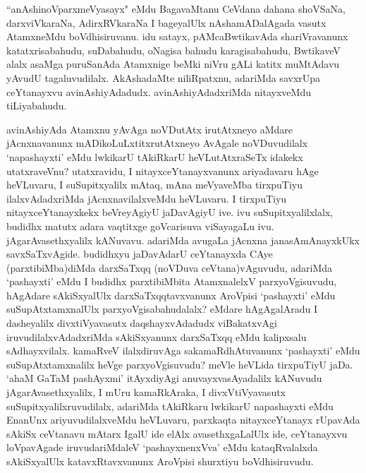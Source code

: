 \begin{artha}
``anAshinoV\s parxmeVyasayx" eMdu BagavaMtanu CeVdana dahana shoVSaNa, darxviVkaraNa, AdirxRVkaraNa I bageyalUlx nAshamADalAgada vasutx AtamxneMdu boVdhisiruvanu. idu satayx, pAMcaBwtikavAda shariVravanunx katatxrisabahudu, suDabahudu, oNagisa bahudu karagisabahudu, BwtikaveV alalx asaMga puruSanAda Atamxnige beMki niVru gALi katitx muMtAdavu yAvudU tagaluvudilalx. AkAshadaMte niliRpatxnu, adariMda savxrUpa ceYtanayxvu avinAshiyAdadudx. avinAshiyAdadxriMda nitayxveMdu tiLiyabahudu. 
\end{artha}


\begin{artha}
avinAshiyAda Atamxnu yAvAga noVDutAtx irutAtxneyo aMdare jAcnxnavanunx mADikoLuLxtitxrutAtxneyo AvAgale noVDuvudilalx `napashayxti' eMdu lwkikarU tAkiRkarU heVLutAtxraSeTx idakekx utatxraveVnu? utatxravidu, I nitayxceYtanayxvanunx ariyadavaru hAge heVLuvaru, I suSupitxyalilx mAtaq, mAna meVyaveMba tirxpuTiyu ilalxvAdadxriMda jAcnxnavilalxveMdu heVLuvaru. I tirxpuTiyu nitayxceYtanayxkekx beVreyAgiyU jaDavAgiyU ive. ivu suSupitxyalilxlalx, budidhx matutx adara vaqtitxge goVcarisuva viSayagaLu ivu. jAgarAvasethxyalilx kANuvavu. adariMda avugaLa jAcnxna janasAmAnayxkUkx savxSaTxvAgide. budidhxyu jaDavAdarU ceYtanayxda CAye (parxtibiMba)diMda darxSaTxqq (noVDuva ceVtana)vAguvudu, adariMda `pashayxti' eMdu I budidhx parxtibiMbita AtamxnalelxV parxyoVgisuvudu, hAgAdare sAkiSxyalUlx darxSaTxqqtavxvanunx AroVpisi `pashayxti' eMdu suSupAtxtamxnalUlx parxyoVgisabahudalalx? eMdare hAgAgalAradu I dasheyalilx divxtiVyavasutx daqshayxvAdadudx viBakatxvAgi iruvudilalxvAdadxriMda sAkiSxyanunx darxSaTxqq eMdu kalipxsalu sAdhayxvilalx. kamaRveV ilalxdiruvAga sakamaRdhAtuvanunx `pashayxti' eMdu suSupAtxtamxnalilx heVge parxyoVgisuvudu? meVle heVLida tirxpuTiyU jaDa. `ahaM GaTaM pashAyxmi' itAyxdiyAgi anuvayxvasAyadalilx kANuvudu jAgarAvasethxyalilx, I mUru kamaRkAraka, I divxVtiVyavasutx suSupitxyalilxruvudilalx, adariMda tAkiRkaru lwkikarU napashayxti eMdu EnanUnx ariyuvudilalxveMdu heVLuvaru, parxkaqta nitayxceYtanayx rUpavAda sAkiSx ceVtanavu mAtarx IgalU ide elAlx avasethxgaLalUlx ide, ceYtanayxvu loVpavAgade iruvudariMdaleV `pashayxnenxVva' eMdu kataqRvalalxda sAkiSxyalUlx katavxRtavxvanunx AroVpisi shurxtiyu boVdhisiruvudu. 
\end{artha}%


